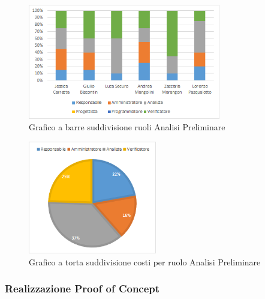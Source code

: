 \begin{figure}[H]
    \centering
    \includegraphics[width=0.75\textwidth]{images/grafico_analisi.png}
    \caption{Grafico a barre suddivisione ruoli Analisi Preliminare}
    \label{fig:grafico_analisi}
\end{figure}

\begin{figure}[H]
    \centering
    \includegraphics[width=0.5\textwidth]{images/torta_analisi.png}
    \caption{Grafico a torta suddivisione costi per ruolo Analisi Preliminare}
    \label{fig:torta_analisi}
\end{figure}


\newpage
\subsubsection{Realizzazione Proof of Concept}\label{sec:preventivo:periodi:progRTB}

